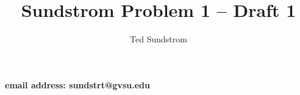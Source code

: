 \documentclass[12pt]{article}
\title{Sundstrom Problem 1 -- Draft 1}
\author{Ted Sundstrom}
\theoremstyle{plain}
\begin{document}
\maketitle

\begin{center}
\textbf{email address: sundstrt@gvsu.edu}
\end{center}
\end{document}
